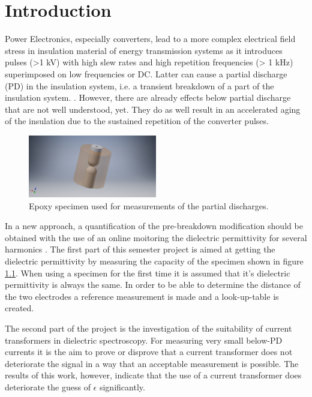 
\chapter{Introduction}
Power Electronics, especially converters, lead to a more complex electrical field stress in insulation material of energy transmission systems as it introduces pulses (>1 kV) with high slew rates and high repetition frequencies (> 1 kHz) superimposed on low frequencies or DC. Latter can cause a partial discharge (PD) in the insulation system, i.e. a transient breakdown of a part of the insulation system. \cite{TransformerEngineering}. However, there are already effects below partial discharge that are not well understood, yet. They do as well result in an accelerated aging of the insulation due to the sustained repetition of the converter pulses. 
\newline


\begin{figure}[!ht]
  
  
  \centerline{\includegraphics[width=0.5\textwidth]{figures/intro/epoxy_specimen.jpg}}
\caption{Epoxy specimen used for measurements of the partial discharges. \protect\footnotemark}
	\label{fig.specimen}
\end{figure}

In a new approach, a quantification of the pre-breakdown modification should be obtained with the use of an online moitoring the dielectric permittivity for several harmonics \cite{FaerberMVISS}.
The first part of this semester project is aimed at getting the dielectric permittivity by measuring the capacity of the specimen shown in figure \ref{fig.specimen}. When using a specimen for the first time it is assumed that it's dielectric permittivity is always the same. In order to be able to determine the distance of the two electrodes a reference measurement is made and a look-up-table is created. 

The second part of the project is the investigation of the suitability of current transformers in dielectric spectroscopy. For measuring very small below-PD currents it is the aim to prove or disprove that a current transformer does not deteriorate the signal in a way that an acceptable measurement is possible. The results of this work, however, indicate that the use of a current transformer does deteriorate the guess of $\epsilon$ significantly. 

